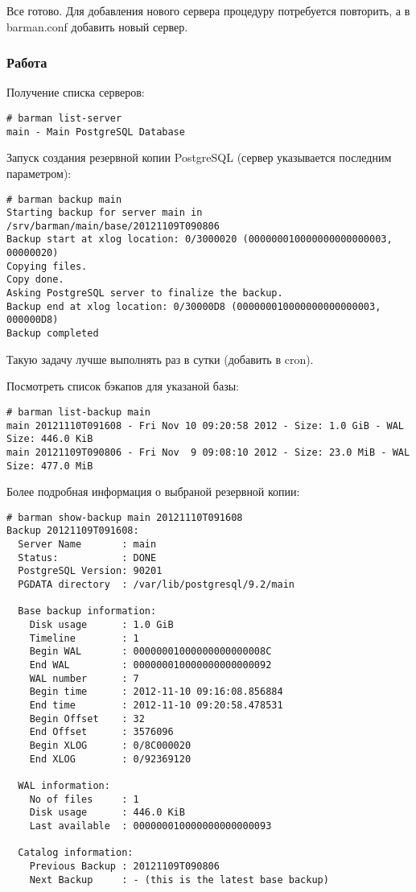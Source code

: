 Все готово. Для добавления нового сервера процедуру потребуется повторить, а в barman.conf добавить новый сервер.

\subsubsection{Работа}

Получение списка серверов:

\begin{lstlisting}[label=lst:barman12,caption=Список серверов]
# barman list-server
main - Main PostgreSQL Database
\end{lstlisting}

Запуск создания резервной копии PostgreSQL (сервер указывается последним параметром):

\begin{lstlisting}[label=lst:barman13,caption=Создание бэкапа]
# barman backup main
Starting backup for server main in /srv/barman/main/base/20121109T090806
Backup start at xlog location: 0/3000020 (000000010000000000000003, 00000020)
Copying files.
Copy done.
Asking PostgreSQL server to finalize the backup.
Backup end at xlog location: 0/30000D8 (000000010000000000000003, 000000D8)
Backup completed
\end{lstlisting}

Такую задачу лучше выполнять раз в сутки (добавить в cron).

Посмотреть список бэкапов для указаной базы:

\begin{lstlisting}[label=lst:barman14,caption=Список бэкапов]
# barman list-backup main
main 20121110T091608 - Fri Nov 10 09:20:58 2012 - Size: 1.0 GiB - WAL Size: 446.0 KiB
main 20121109T090806 - Fri Nov  9 09:08:10 2012 - Size: 23.0 MiB - WAL Size: 477.0 MiB
\end{lstlisting}

Более подробная информация о выбраной резервной копии:

\begin{lstlisting}[label=lst:barman15,caption=Информация о выбраной резервной копии]
# barman show-backup main 20121110T091608
Backup 20121109T091608:
  Server Name       : main
  Status:           : DONE
  PostgreSQL Version: 90201
  PGDATA directory  : /var/lib/postgresql/9.2/main

  Base backup information:
    Disk usage      : 1.0 GiB
    Timeline        : 1
    Begin WAL       : 00000001000000000000008C
    End WAL         : 000000010000000000000092
    WAL number      : 7
    Begin time      : 2012-11-10 09:16:08.856884
    End time        : 2012-11-10 09:20:58.478531
    Begin Offset    : 32
    End Offset      : 3576096
    Begin XLOG      : 0/8C000020
    End XLOG        : 0/92369120

  WAL information:
    No of files     : 1
    Disk usage      : 446.0 KiB
    Last available  : 000000010000000000000093

  Catalog information:
    Previous Backup : 20121109T090806
    Next Backup     : - (this is the latest base backup)
\end{lstlisting}

